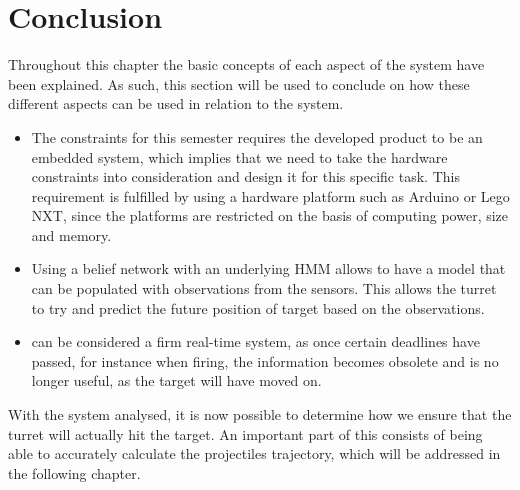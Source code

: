 \section{Conclusion}\label{EmbConc}

Throughout this chapter the basic concepts of each aspect of the system have
been explained. As such, this section will be used to conclude on how these
different aspects can be used in relation to the \name system.

\begin{itemize}
  \item The constraints for this semester requires the developed product to be
  an embedded system, which implies that we need to take the hardware
  constraints into consideration and design it for this specific task. This
  requirement is fulfilled by using a hardware platform such as Arduino or Lego
  NXT, since the platforms are restricted on the basis of computing power, size
  and memory.
  \item Using a belief network with an underlying HMM allows \name to have a
  model that can be populated with observations from the sensors. This allows
  the turret to try and predict the future position of target based on the
  observations.
  \item \name can be considered a firm real-time system, as once certain
  deadlines have passed, for instance when firing, the information becomes
  obsolete and is no longer useful, as the target will have moved on. 
\end{itemize}  

With the system analysed, it is now possible to determine how we ensure that
the turret will actually hit the target. An important part of this consists of
being able to accurately calculate the projectiles trajectory, which will be
addressed in the following chapter.


% 

